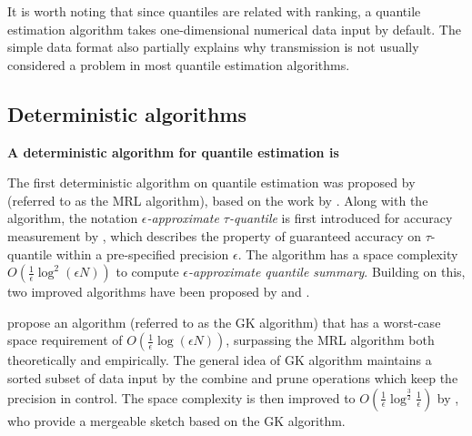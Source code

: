 It is worth noting that since quantiles are related with ranking, a quantile estimation algorithm takes one-dimensional numerical data input by default. The simple data format also partially explains why transmission is not usually considered a problem in most quantile estimation algorithms.
\subsection{Deterministic algorithms}
\label{deterministic}
\textbf{A deterministic algorithm for quantile estimation is}

The first deterministic algorithm on quantile estimation was proposed by \citeauthor{mankuApproximateMediansOther1998}\cite{mankuApproximateMediansOther1998} (referred to as the MRL algorithm), based on the work by \citeauthor{munroSelectionSortingLimited1980}\cite{munroSelectionSortingLimited1980}. Along with the algorithm, the notation \textit{$\epsilon$-approximate $\tau$-quantile} is first introduced for accuracy measurement by \citeauthor{mankuApproximateMediansOther1998}, which describes the property of guaranteed accuracy on $\tau$-quantile within a pre-specified precision $\epsilon$. The algorithm has a space complexity $O(\frac{1}{\epsilon}\log^2 (\epsilon N))$ to compute \textit{$\epsilon$-approximate quantile summary}. Building on this, two improved algorithms have been proposed by \citeauthor{greenwaldQuantilesEquidepthHistograms2016a}\cite{greenwaldQuantilesEquidepthHistograms2016a} and \citeauthor{shrivastavaMediansNewAggregation2004b}\cite{shrivastavaMediansNewAggregation2004b}.

\citeauthor{greenwaldQuantilesEquidepthHistograms2016a}\cite{greenwaldQuantilesEquidepthHistograms2016a} propose an algorithm (referred to as the GK algorithm) that has a worst-case space requirement of $O(\frac{1}{\epsilon}\log(\epsilon N))$, surpassing the MRL algorithm both theoretically and empirically. The general idea of GK algorithm maintains a sorted subset of data input by the combine and prune operations which keep the precision in control. The space complexity is then improved to 
$O(\frac{1}{\epsilon}\log^{\frac{3}{2}}\frac{1}{\epsilon})$ by \citeauthor{agarwalMergeableSummaries2013}\cite{agarwalMergeableSummaries2013}, who provide a mergeable sketch based on the GK algorithm.

